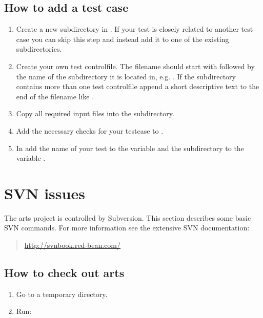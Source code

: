 \subsection{How to add a test case}
\begin{enumerate}
\item Create a new subdirectory in . If your test is closely
  related to another test case you can skip this step and instead add it
  to one of the existing subdirectories.
\item Create your own test controlfile. The filename should start with
   followed by the name of the subdirectory it is located in,
  e.g. . If the subdirectory contains more
  than one test controlfile append a short descriptive text to the end of the
  filename like .
\item Copy all required input files into the subdirectory.
\item Add the necessary checks for your testcase to
  .
\item In  add the name of your test to the
  variable  and the subdirectory to the variable
  .

\end{enumerate}


\section{SVN issues}
 \label{sec:development:cvs}

The arts project is controlled by Subversion. This section describes some
basic SVN commands. For more information see the extensive SVN
documentation:
\begin{quote}
  \url{http://svnbook.red-bean.com/}
\end{quote}




\subsection{How to check out arts}
\begin{enumerate}
\item Go to a temporary directory.
\item Run: 
\end{enumerate}


